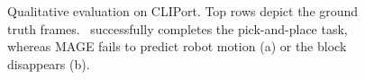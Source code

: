  

\begin{figure}[t]
	
	
	
	\vspace{0.4cm}
	
	
	
	\vspace{-0.6cm}
	\caption{
		Qualitative evaluation on CLIPort. Top rows depict the ground truth frames.
		\Method~successfully completes the pick-and-place task, whereas MAGE fails to predict robot motion (a) or the block disappears (b).
	}
	\label{fig: cliport qual_00}
	\vspace{-0.3cm}
\end{figure}